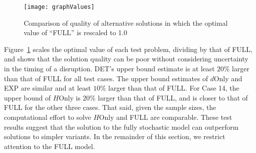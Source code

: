 \documentclass[11pt]{article}
\begin{document}
	\begin{figure}
		\centering
		\texttt{[image: graphValues]}
		\caption{Comparison of quality of alternative solutions in which the optimal value of ``FULL'' is rescaled to 1.0}
		\label{fig:value}
	\end{figure}
	
	Figure~\ref{fig:value} scales the optimal value of each test problem, dividing by that of FULL, and shows that the solution quality can be poor without considering uncertainty in the timing of a disruption. DET's upper bound estimate is at least \(20\%\) larger than that of FULL for all test cases. The upper bound estimates of \(d\)Only and EXP are similar and at least \(10\%\) larger than that of FULL. For Case 14, the upper bound of \(H\)Only is \(20\%\) larger than that of FULL, and is closer to that of FULL for the other three cases.  That said, given the sample sizes, the computational effort to solve \(H\)Only and FULL are comparable. These test results suggest that the solution to the fully stochastic model can outperform solutions to simpler variants. In the remainder of this section, we restrict attention to the FULL model.
	
\end{document}
